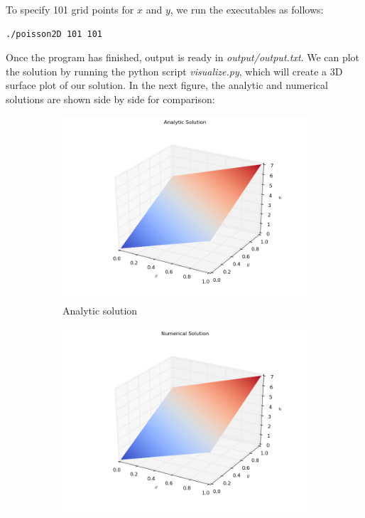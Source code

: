 \documentclass[11pt]{report}
\begin{document}
To specify 101 grid points for $x$ and $y$, we run the executables as follows:

\begin{lstlisting}
./poisson2D 101 101
\end{lstlisting}

Once the program has finished, output is ready in \emph{output/output.txt}. We can plot the solution by running the python script \emph{visualize.py}, which will create a 3D surface plot of our solution. In the next figure, the analytic and numerical solutions are shown side by side for comparison:

\begin{figure}[h!]
\centering
\begin{subfigure}{0.5\textwidth}
  \centering
  \includegraphics[width=1.0\linewidth]{images/example1_analytic}
  \caption{Analytic solution}
  \label{fig:sub1}
\end{subfigure}%
\begin{subfigure}{0.5\textwidth}
  \centering
  \includegraphics[width=1.0\linewidth]{images/example1_numerical}

\end{subfigure}
\end{figure}
\end{document}

